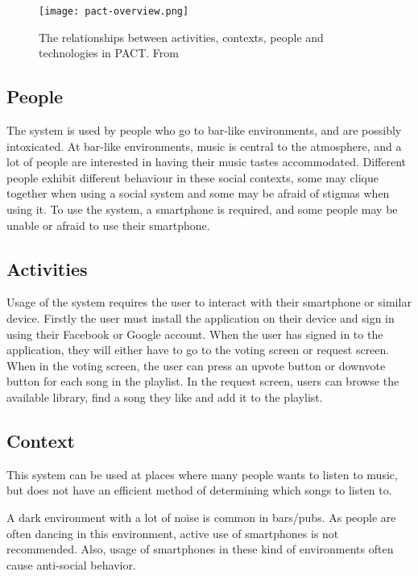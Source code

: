 
\begin{figure}
  \centering
  \texttt{[image: pact-overview.png]}
  \caption{The relationships between activities, contexts, people and technologies in PACT. From \cite{benyon2013designing}}
  \label{fig:pact-overview}
\end{figure}

\subsection{People}
\label{sub:pact_people}

The system is used by people who go to bar-like environments, and are possibly intoxicated. At bar-like environments, music is central to the atmosphere, and a lot of people are interested in having their music tastes accommodated. Different people exhibit different behaviour in these social contexts, some may clique together when using a social system and some may be afraid of stigmas when using it. To use the system, a smartphone is required, and some people may be unable or afraid to use their smartphone.

\subsection{Activities}
\label{sub:pact_activities}

Usage of the system requires the user to interact with their smartphone or similar device. Firstly the user must install the application on their device and sign in using their Facebook or Google account. When the user has signed in to the application, they will either have to go to the voting screen or request screen. When in the voting screen, the user can press an upvote button or downvote button for each song in the playlist. In the request screen, users can browse the available library, find a song they like and add it to the playlist.

\subsection{Context}
\label{sub:pact_context}

This system can be used at places where many people wants to listen to music, but does not have an efficient method of determining which songs to listen to.

A dark environment with a lot of noise is common in bars/pubs. As people are often dancing in this environment, active use of smartphones is not recommended. Also, usage of smartphones in these kind of environments often cause anti-social behavior.

